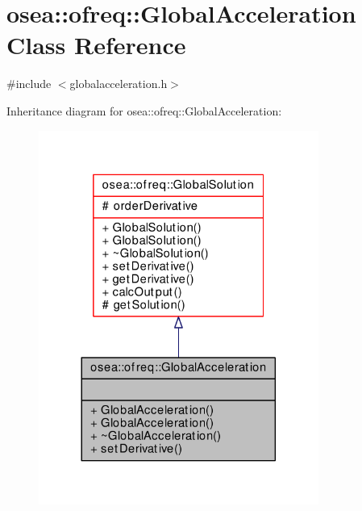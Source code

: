 \hypertarget{classosea_1_1ofreq_1_1_global_acceleration}{\section{osea\-:\-:ofreq\-:\-:Global\-Acceleration Class Reference}
\label{classosea_1_1ofreq_1_1_global_acceleration}
}


{\ttfamily \#include $<$globalacceleration.\-h$>$}



Inheritance diagram for osea\-:\-:ofreq\-:\-:Global\-Acceleration\-:
\nopagebreak
\begin{figure}[H]
\begin{center}
\leavevmode
\includegraphics[width=260pt]{classosea_1_1ofreq_1_1_global_acceleration__inherit__graph}
\end{center}
\end{figure}
